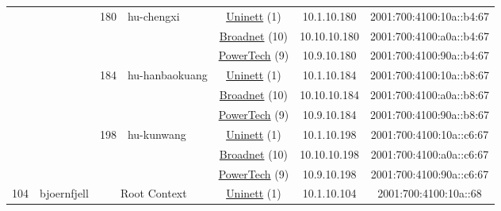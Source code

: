 \begin{small}
\begin{center}
\begin{longtable}{|c|c|c|c|c|c|c|c|}
  &  & \multirow{3}{*}{\tiny{180}} & \multicolumn{1}{|l|}{\multirow{3}{*}{\tiny{hu-chengxi}}} & \multicolumn{2}{|c|}{\tiny{\href{https://www.uninett.no}{Uninett} (1)}} & \tiny{10.1.10.180} & \tiny{2001:700:4100:10a::b4:67} \\* \cline{5-5}\cline{6-6}\cline{7-7}\cline{8-8}
  &  &  &  & \multicolumn{2}{|c|}{\tiny{\href{https://www.broadnet.no}{Broadnet} (10)}} & \tiny{10.10.10.180} & \tiny{2001:700:4100:a0a::b4:67} \\* \cline{5-5}\cline{6-6}\cline{7-7}\cline{8-8}
  &  &  &  & \multicolumn{2}{|c|}{\tiny{\href{http://www.powertech.no}{PowerTech} (9)}} & \tiny{10.9.10.180} & \tiny{2001:700:4100:90a::b4:67} \\* \cline{3-3}\cline{4-4}\cline{5-5}\cline{6-6}\cline{7-7}\cline{8-8}
  &  & \multirow{3}{*}{\tiny{184}} & \multicolumn{1}{|l|}{\multirow{3}{*}{\tiny{hu-hanbaokuang}}} & \multicolumn{2}{|c|}{\tiny{\href{https://www.uninett.no}{Uninett} (1)}} & \tiny{10.1.10.184} & \tiny{2001:700:4100:10a::b8:67} \\* \cline{5-5}\cline{6-6}\cline{7-7}\cline{8-8}
  &  &  &  & \multicolumn{2}{|c|}{\tiny{\href{https://www.broadnet.no}{Broadnet} (10)}} & \tiny{10.10.10.184} & \tiny{2001:700:4100:a0a::b8:67} \\* \cline{5-5}\cline{6-6}\cline{7-7}\cline{8-8}
  &  &  &  & \multicolumn{2}{|c|}{\tiny{\href{http://www.powertech.no}{PowerTech} (9)}} & \tiny{10.9.10.184} & \tiny{2001:700:4100:90a::b8:67} \\* \cline{3-3}\cline{4-4}\cline{5-5}\cline{6-6}\cline{7-7}\cline{8-8}
  &  & \multirow{3}{*}{\tiny{198}} & \multicolumn{1}{|l|}{\multirow{3}{*}{\tiny{hu-kunwang}}} & \multicolumn{2}{|c|}{\tiny{\href{https://www.uninett.no}{Uninett} (1)}} & \tiny{10.1.10.198} & \tiny{2001:700:4100:10a::c6:67} \\* \cline{5-5}\cline{6-6}\cline{7-7}\cline{8-8}
  &  &  &  & \multicolumn{2}{|c|}{\tiny{\href{https://www.broadnet.no}{Broadnet} (10)}} & \tiny{10.10.10.198} & \tiny{2001:700:4100:a0a::c6:67} \\* \cline{5-5}\cline{6-6}\cline{7-7}\cline{8-8}
  &  &  &  & \multicolumn{2}{|c|}{\tiny{\href{http://www.powertech.no}{PowerTech} (9)}} & \tiny{10.9.10.198} & \tiny{2001:700:4100:90a::c6:67} \\ \hline
 \multirow{45}{*}{\tiny{104}} & \multicolumn{1}{|l|}{\multirow{45}{*}{\tiny{bjoernfjell}}} & \multicolumn{2}{|c|}{\multirow{3}{*}{\tiny{Root Context}}} & \multicolumn{2}{|c|}{\tiny{\href{https://www.uninett.no}{Uninett} (1)}} & \tiny{10.1.10.104} & \tiny{2001:700:4100:10a::68} \\* \cline{5-5}\cline{6-6}\cline{7-7}\cline{8-8}

\end{longtable}
\end{center}
\end{small}

